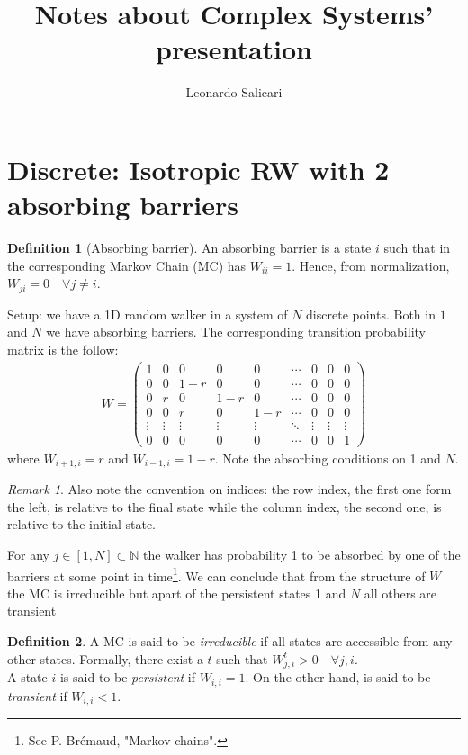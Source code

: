 \documentclass[4apaper,11pt,fleqn]{article}
\title{Notes about Complex Systems' presentation}
\author{Leonardo Salicari}
\theoremstyle{remark}
\newtheorem*{rem}{Remark}
\theoremstyle{definition}
\newtheorem*{dfn}{Definition}
\begin{document}
\maketitle
\tableofcontents


\section{Discrete: Isotropic RW with 2 absorbing barriers}
\begin{dfn}[Absorbing barrier]
  An absorbing barrier is a state $i$ such that in the corresponding Markov Chain (MC) has $W_{ii} = 1$.
  Hence, from normalization, $W_{ji} = 0 \quad \forall  j \neq i$.
\end{dfn}
Setup: we have a 1D random walker in a system of $N$ discrete points. Both in $1$ and $N$ we have absorbing barriers. The corresponding transition probability matrix is the follow:
\begin{align*}
  W = \left( \begin{array}{ccccccccc}{1} & {0} & {0} & {0} & {0} & {\cdots} & {0} & {0} & {0} \\ {0} & {0} & {1-r} & {0} & {0} & {\cdots} & {0} & {0} & {0} \\ {0} & {r} & {0} & {1-r} & {0} & {\cdots} & {0} & {0} & {0} \\ {0} & {0} & {r} & {0} & {1-r} & {\cdots} & {0} & {0} & {0} \\ {\vdots} & {\vdots} & {\vdots} & {\vdots} & {\vdots} & {\ddots} & {\vdots} & {\vdots} & {\vdots} \\ {0} & {0} & {0} & {0} & {0} & {\cdots} & {0} & {0} & {1} \end{array} \right)
\end{align*}
where $ W_{i+1,i} = r $ and $W_{i-1,i} = 1-r$. Note the absorbing conditions on 1 and $N$.
\begin{rem}
  Also note the convention on indices: the row index, the first one form the left, is relative to the final state while the column index, the second one, is relative to the initial state.
\end{rem}
For any $j \in [1,N] \subset \mathbb{N}$ the walker has probability 1 to be absorbed by one of the barriers at some point in time\footnote{See P. Brémaud, "Markov chains".}. We can conclude that from the structure of $W$ the MC is irreducible but apart of the persistent states 1 and $N$ all others are transient
\begin{dfn}
  A MC is said to be \emph{irreducible} if all states are accessible from any other states. Formally, there exist a $t$ such that $W^t_{j,i} > 0 \quad \forall j, i$.\\
  A state $i$ is said to be \emph{persistent} if $W_{i,i}=1$. On the other hand, is said to be \emph{transient} if $W_{i,i}<1$.
\end{dfn}
\end{document}
